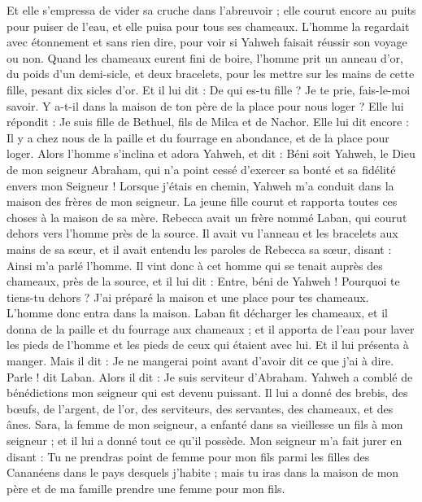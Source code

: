 \begin{multicols}{2}
Et elle s'empressa de vider sa cruche dans l'abreuvoir ; elle courut encore au puits pour puiser de l'eau, et elle puisa pour tous ses chameaux.
L'homme la regardait avec étonnement et sans rien dire, pour voir si Yahweh faisait réussir son voyage ou non.
Quand les chameaux eurent fini de boire, l'homme prit un anneau d'or, du poids d'un demi-sicle, et deux bracelets, pour les mettre sur les mains de cette fille, pesant dix sicles d'or.
Et il lui dit : De qui es-tu fille ? Je te prie, fais-le-moi savoir. Y a-t-il dans la maison de ton père de la place pour nous loger ?
Elle lui répondit : Je suis fille de Bethuel, fils de Milca et de Nachor.
Elle lui dit encore : Il y a chez nous de la paille et du fourrage en abondance, et de la place pour loger.
Alors l'homme s'inclina et adora Yahweh,
et dit : Béni soit Yahweh, le Dieu de mon seigneur Abraham, qui n'a point cessé d'exercer sa bonté et sa fidélité envers mon Seigneur ! Lorsque j'étais en chemin, Yahweh m'a conduit dans la maison des frères de mon seigneur.
La jeune fille courut et rapporta toutes ces choses à la maison de sa mère.
Rebecca avait un frère nommé Laban, qui courut dehors vers l'homme près de la source.
Il avait vu l'anneau et les bracelets aux mains de sa sœur, et il avait entendu les paroles de Rebecca sa sœur, disant : Ainsi m'a parlé l'homme. Il vint donc à cet homme qui se tenait auprès des chameaux, près de la source,
et il lui dit : Entre, béni de Yahweh ! Pourquoi te tiens-tu dehors ? J'ai préparé la maison et une place pour tes chameaux.
L'homme donc entra dans la maison. Laban fit décharger les chameaux, et il donna de la paille et du fourrage aux chameaux ; et il apporta de l'eau pour laver les pieds de l'homme et les pieds de ceux qui étaient avec lui.
Et il lui présenta à manger. Mais il dit : Je ne mangerai point avant d'avoir dit ce que j'ai à dire. Parle ! dit Laban.
Alors il dit : Je suis serviteur d'Abraham.
Yahweh a comblé de bénédictions mon seigneur qui est devenu puissant. Il lui a donné des brebis, des bœufs, de l'argent, de l'or, des serviteurs, des servantes, des chameaux, et des ânes.
Sara, la femme de mon seigneur, a enfanté dans sa vieillesse un fils à mon seigneur ; et il lui a donné tout ce qu'il possède.
Mon seigneur m'a fait jurer en disant : Tu ne prendras point de femme pour mon fils parmi les filles des Cananéens dans le pays desquels j'habite ;
mais tu iras dans la maison de mon père et de ma famille prendre une femme pour mon fils.

\end{multicols}

